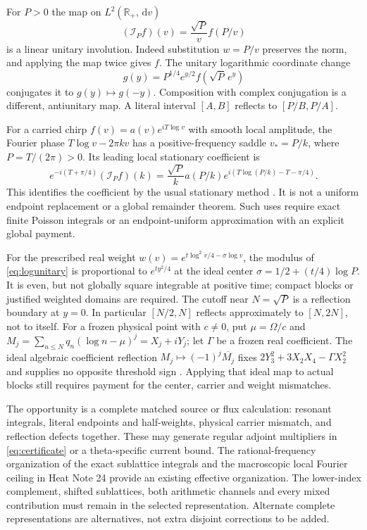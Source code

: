 \documentclass[11pt]{article}
\theoremstyle{definition}
\theoremstyle{remark}
\newcommand{\dd}{\,\mathrm d}
\begin{document}
For $P>0$ the map on $L^2(\mathbb R_+,\dd v)$
\begin{equation}
 (\mathcal I_Pf)(v)=\frac{\sqrt P}{v}f(P/v)
 \label{eq:inversion}
\end{equation}
is a linear unitary involution. Indeed substitution $w=P/v$ preserves
the norm, and applying the map twice gives $f$. The unitary logarithmic
coordinate change
\begin{equation}
 g(y)=P^{1/4}e^{y/2}f(\sqrt P\,e^y)
 \label{eq:logunitary}
\end{equation}
conjugates it to $g(y)\mapsto g(-y)$. Composition with complex
conjugation is a different, antiunitary map. A literal interval $[A,B]$
reflects to $[P/B,P/A]$.

For a carried chirp $f(v)=a(v)e^{iT\log v}$ with smooth local amplitude,
the Fourier phase $T\log v-2\pi kv$ has a positive-frequency saddle
$v_*=P/k$, where $P=T/(2\pi)>0$. Its leading local stationary coefficient
is
\begin{equation}
 e^{-i(T+\pi/4)}(\mathcal I_Pf)(k)
 =\frac{\sqrt P}{k}a(P/k)
          e^{i(T\log(P/k)-T-\pi/4)}.
 \label{eq:stationary-reflection}
\end{equation}
This identifies the coefficient by the usual stationary method
\cite{dlmfstationary}. It is not a uniform endpoint replacement or a
global remainder theorem. Such uses require exact finite Poisson integrals
or an endpoint-uniform approximation with an explicit global payment.

For the prescribed real weight $w(v)=e^{t\log^2v/4-\sigma\log v}$,
the modulus of \eqref{eq:logunitary} is proportional to $e^{ty^2/4}$
at the ideal center $\sigma=1/2+(t/4)\log P$.
It is even, but not globally square integrable at positive time; compact
blocks or justified weighted domains are required. The cutoff near
$N=\sqrt P$ is a reflection boundary at $y=0$.
In particular $[N/2,N]$ reflects approximately to $[N,2N]$, not to itself.
For a frozen physical point with $c\ne0$, put $\mu=\Omega/c$ and
$M_j=\sum_{n\le N}q_n(\log n-\mu)^j=X_j+iY_j$; let $\Gamma$ be a
frozen real coefficient. The ideal algebraic coefficient reflection
$M_j\mapsto(-1)^j\overline{M_j}$ fixes
$2Y_3^2+3X_2X_4-\Gamma X_2^2$ and supplies no opposite threshold sign
\cite{torusnotes,heat25}. Applying that ideal map to actual blocks still
requires payment for the center, carrier and weight mismatches.

The opportunity is a complete matched source or flux calculation:
resonant integrals, literal endpoints and half-weights, physical carrier
mismatch, and reflection defects together. These may generate regular
adjoint multipliers in \eqref{eq:certificate} or a theta-specific current
bound. The rational-frequency organization of the exact sublattice
integrals and the macroscopic local Fourier ceiling in Heat Note 24
\cite{heatnotes} provide an existing effective organization.
The lower-index complement, shifted
sublattices, both arithmetic channels and every mixed contribution must
remain in the selected representation. Alternate complete representations
are alternatives, not extra disjoint corrections to be added.
\end{document}
